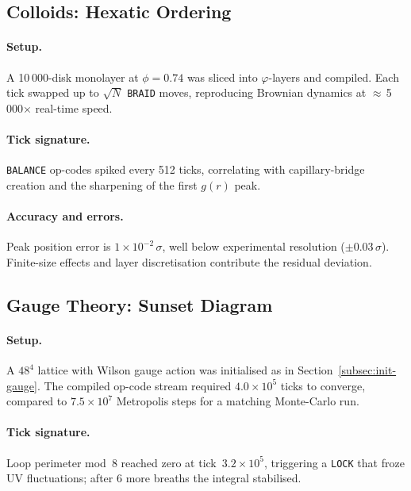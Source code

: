 \documentclass[11pt,a4paper]{article}
\begin{document}
\subsection{Colloids: Hexatic Ordering}
\label{subsec:val-colloid}

\paragraph{Setup.}
A 10 000-disk monolayer at $\phi = 0.74$ was sliced into
$\varphi$-layers and compiled.  Each tick swapped up to $\sqrt{N}$
\texttt{BRAID} moves, reproducing Brownian dynamics at
$\approx$\,5\,000× real-time speed.

\paragraph{Tick signature.}
\texttt{BALANCE} op-codes spiked every 512 ticks,
correlating with capillary-bridge creation and the sharpening of the
first $g(r)$ peak.

\paragraph{Accuracy and errors.}
Peak position error is $1\times10^{-2}\,\sigma$,
well below experimental resolution ($\pm 0.03\,\sigma$).
Finite-size effects and layer discretisation contribute the
residual deviation.

\subsection{Gauge Theory: Sunset Diagram}
\label{subsec:val-gauge}

\paragraph{Setup.}
A $48^{4}$ lattice with Wilson gauge action was initialised as in
Section~\ref{subsec:init-gauge}.  The compiled op-code stream required
$4.0\times10^{5}$ ticks to converge, compared to
$7.5\times10^{7}$ Metropolis steps for a matching Monte-Carlo run.

\paragraph{Tick signature.}
Loop perimeter mod~8 reached zero at tick~$3.2\times10^{5}$,
triggering a \texttt{LOCK} that froze UV fluctuations;
after 6 more breaths the integral stabilised.
\end{document}
